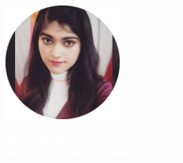 \documentclass[a4paper, 11pt]{article}
\begin{document}
    \begin{tcolorbox}
        \begin{center}
            \begin{minipage}{4cm}
                \includegraphics[width=4.4cm]{myimage.png}
            \end{minipage}%
            \begin{minipage}{14.4cm}
                \raggedleft
                \Huge{\textcolor{white}{\textbf{Mouli Dutta}}}\\
                \vspace{0.5cm}
                \Large{\textcolor{white}{\emph{Master of Computer Application Student}}}
            \end{minipage}
        \end{center}
    \end{tcolorbox}
\end{document}
